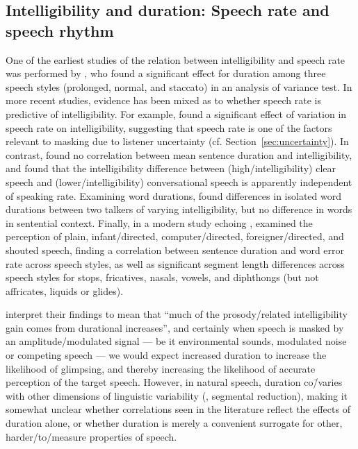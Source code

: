 \subsection[Intelligibility and duration]{Intelligibility and duration: Speech rate and speech rhythm\label{sec:IntelDur}}
One of the earliest studies of the relation between intelligibility and speech rate was performed by \citet{Tolhurst1957a}, who found a significant effect for duration among three speech styles (prolonged, normal, and staccato) in an analysis of variance test.  In more recent studies, evidence has been mixed as to whether speech rate is predictive of intelligibility.  For example, \citet{SommersEtAl1994} found a significant effect of variation in speech rate on intelligibility, suggesting that speech rate is one of the factors relevant to masking due to listener uncertainty (cf. Section~\ref{sec:uncertainty}).  In contrast, \citet{BradlowEtAl1996} found no correlation between mean sentence duration and intelligibility, and \citet{KrauseBraida2002} found that the intelligibility difference between (high\-/intelligibility) clear speech and (lower\-/intelligibility) conversational speech is apparently independent of speaking rate.\footnotemark{}  Examining word durations, \citet{BondMoore1994} found differences in isolated word durations between two talkers of varying intelligibility, but no difference in words in sentential context.  Finally, in a modern study echoing \citet{Tolhurst1957a}, \citet{MayoEtAl2012} examined the perception of plain, infant\-/directed, computer\-/directed, foreigner\-/directed, and shouted speech, finding a correlation between sentence duration and word error rate across speech styles, as well as significant segment length differences across speech styles for stops, fricatives, nasals, vowels, and diphthongs (but not affricates, liquids or glides).  

\citeauthor*{MayoEtAl2012} interpret their findings to mean that “much of the prosody\-/related intelligibility gain comes from durational increases”, and certainly when speech is masked by an amplitude\-/modulated signal — be it environmental sounds, modulated noise or competing speech — we would expect increased duration to increase the likelihood of glimpsing, and thereby increasing the likelihood of accurate perception of the target speech.  However, in natural speech, duration co\=/varies with other dimensions of linguistic variability (\eg, segmental reduction), making it somewhat unclear whether correlations seen in the literature reflect the effects of duration alone, or whether duration is merely a convenient surrogate for other, harder\-/to\-/measure properties of speech.

